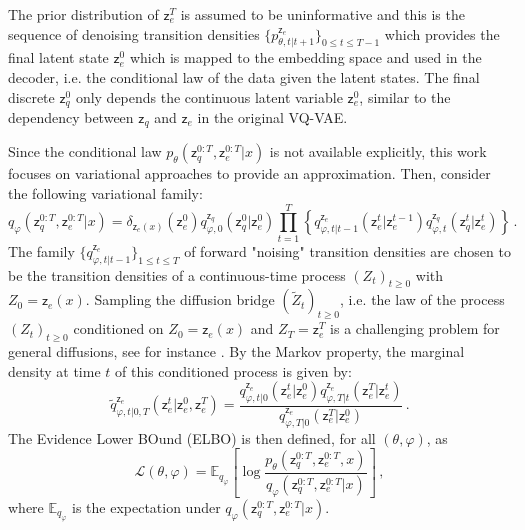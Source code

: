 \documentclass[nolayout]{article}
\theoremstyle{plain}
\theoremstyle{definition}
\theoremstyle{remark}
\newcommand{\latentcont}{\mathsf{z}_e}
\newcommand{\latentdis}{\mathsf{z}_q}
\newcommand{\bckw}{\tilde{q}}
\begin{document}
The prior distribution of  $\latentcont^T$ is assumed to be uninformative and this is the sequence of denoising transition densities $\{p^{\latentcont}_{\theta,t|t+1}\}_{0\leqslant t\leqslant T-1}$ which provides the final latent state $\latentcont^0$ which is mapped to the embedding space and used in the decoder, i.e. the conditional law of the data given the latent states. The final discrete $\latentdis^0$ only depends the continuous latent variable  $\latentcont^0$, similar to the dependency between $\latentdis$ and $\latentcont$ in the original VQ-VAE.

Since the conditional law $p_{\theta}(\latentdis^{0:T},\latentcont^{0:T}| x)$ is not available explicitly, this work focuses on  variational approaches to provide an approximation. Then, consider the following variational family:
$$
q_{\varphi}(\latentdis^{0:T},\latentcont^{0:T}| x) = \delta_{\latentcont(x)}(\latentcont^0)q_{\varphi,0}^{\latentdis}(\latentdis^0|\latentcont^0)\prod_{t=1}^T\left\{ q^{\latentcont}_{\varphi,t|t-1}(\latentcont^t|\latentcont^{t-1})q^{\latentdis}_{\varphi,t}(\latentdis^t|\latentcont^t)\right\}\,.
$$
The family $\{q^{\latentcont}_{\varphi,t|t-1}\}_{1\leqslant t \leqslant T}$  of forward "noising" transition densities are chosen to be the transition densities of a continuous-time process $(Z_t)_{t\geqslant 0}$ with $Z_0 = \latentcont(x)$. Sampling the diffusion bridge $(\tilde Z_t)_{t\geqslant 0}$, i.e. the law of the process $(Z_t)_{t\geqslant 0}$  conditioned on $Z_0 = \latentcont(x)$ and $Z_T = \latentcont^T$ is a challenging problem for general diffusions, see for instance \cite{beskos2008mcmc,lin2010generating,bladt2016simulation}. By the Markov property, the  marginal density at time $t$ of this conditioned process is given by:
\begin{equation}
\label{eq:markov:bridge}
\bckw^{\latentcont}_{\varphi,t|0,T}(\latentcont^t|\latentcont^0,\latentcont^T) = \frac{q^{\latentcont}_{\varphi,t|0}(\latentcont^t|\latentcont^{0})q^{\latentcont}_{\varphi,T|t}(\latentcont^T|\latentcont^{t})}{q^{\latentcont}_{\varphi,T|0}(\latentcont^T|\latentcont^{0})}\,.
\end{equation}
The Evidence Lower BOund (ELBO) is then defined, for all $(\theta,\varphi)$, as
$$
\mathcal{L}(\theta,\varphi) = \mathbb{E}_{q_{\varphi}}\left[\log \frac{p_{\theta}(\latentdis^{0:T},\latentcont^{0:T},x)}{q_{\varphi}(\latentdis^{0:T},\latentcont^{0:T}| x)}\right]\,,
$$
where $\mathbb{E}_{q_{\varphi}}$ is the expectation under $q_{\varphi}(\latentdis^{0:T},\latentcont^{0:T}| x)$.
\end{document}
